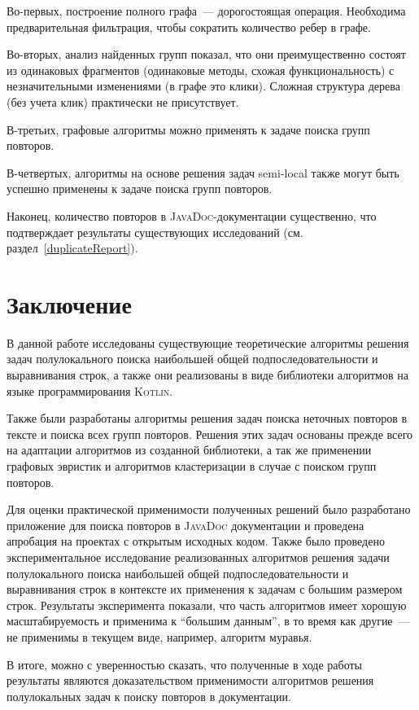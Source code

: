 Во-первых, построение полного графа~--- дорогостоящая операция.
Необходима предварительная фильтрация, чтобы сократить количество ребер в графе. 

Во-вторых, анализ найденных групп показал, что они преимущественно состоят из одинаковых фрагментов (одинаковые методы, схожая функциональность) с незначительными изменениями (в графе это клики).
Сложная структура дерева (без учета клик) практически не присутствует.

В-третьих, графовые алгоритмы можно применять к задаче поиска групп повторов.

В-четвертых, алгоритмы на основе решения задач semi-local также могут быть успешно применены к задаче поиска групп повторов.

Наконец, количество повторов в \textsc{JavaDoc}-документации существенно, что подтверждает результаты существующих исследований (см. раздел~\ref{duplicateReport}).

\section*{Заключение}

В данной работе исследованы существующие теоретические алгоритмы решения задач полулокального поиска наибольшей общей подпоследовательности и выравнивания строк, а также они реализованы в виде библиотеки алгоритмов на языке программирования \textsc{Kotlin}.

Также были разработаны алгоритмы решения задач поиска неточных повторов в тексте и поиска всех групп повторов.
Решения этих задач основаны прежде всего на адаптации алгоритмов из созданной библиотеки, а так же применении графовых эвристик и алгоритмов кластеризации в случае с поиском групп повторов. 

Для оценки практической применимости полученных решений было разработано приложение для поиска повторов в \textsc{JavaDoc} документации и проведена апробация на проектах с открытым исходных кодом.
Также было проведено экспериментальное исследование реализованных алгоритмов решения задачи полулокального поиска наибольшей общей подпоследовательности и выравнивания строк в контексте их применения к задачам с большим размером строк.
Результаты эксперимента показали, что часть алгоритмов имеет хорошую масштабируемость и применима к ``большим данным'', в то время как другие~--- не применимы в текущем виде, например, алгоритм муравья. 

В итоге, можно с уверенностью сказать, что полученные в ходе работы результаты являются доказательством применимости алгоритмов решения полулокальных задач к поиску повторов в документации.





